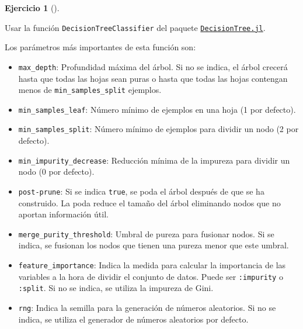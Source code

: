 \documentclass[
  a4paper,
]{scrreport}
\providecommand{\tightlist}{%
  \setlength{\itemsep}{0pt}\setlength{\parskip}{0pt}}\usepackage{longtable,booktabs,array}
\theoremstyle{definition}
\newtheorem{exercise}{Ejercicio}[chapter]
\theoremstyle{remark}
\begin{document}
\begin{exercise}[]
\begin{enumerate}
\begin{tcolorbox}
  Usar la función \texttt{DecisionTreeClassifier} del paquete
  \href{https://docs.juliahub.com/DecisionTree/}{\texttt{DecisionTree.jl}}.

  Los parámetros más importantes de esta función son:

  \begin{itemize}
  \tightlist
  \item
    \texttt{max\_depth}: Profundidad máxima del árbol. Si no se indica,
    el árbol crecerá hasta que todas las hojas sean puras o hasta que
    todas las hojas contengan menos de \texttt{min\_samples\_split}
    ejemplos.
  \item
    \texttt{min\_samples\_leaf}: Número mínimo de ejemplos en una hoja
    (1 por defecto).
  \item
    \texttt{min\_samples\_split}: Número mínimo de ejemplos para dividir
    un nodo (2 por defecto).
  \item
    \texttt{min\_impurity\_decrease}: Reducción mínima de la impureza
    para dividir un nodo (0 por defecto).
  \item
    \texttt{post-prune}: Si se indica \texttt{true}, se poda el árbol
    después de que se ha construido. La poda reduce el tamaño del árbol
    eliminando nodos que no aportan información útil.
  \item
    \texttt{merge\_purity\_threshold}: Umbral de pureza para fusionar
    nodos. Si se indica, se fusionan los nodos que tienen una pureza
    menor que este umbral.
  \item
    \texttt{feature\_importance}: Indica la medida para calcular la
    importancia de las variables a la hora de dividir el conjunto de
    datos. Puede ser \texttt{:impurity} o \texttt{:split}. Si no se
    indica, se utiliza la impureza de Gini.
  \item
    \texttt{rng}: Indica la semilla para la generación de números
    aleatorios. Si no se indica, se utiliza el generador de números
    aleatorios por defecto.
  \end{itemize}

  \end{tcolorbox}

  \begin{tcolorbox}[enhanced jigsaw, left=2mm, colback=white, coltitle=black, opacitybacktitle=0.6, titlerule=0mm, breakable, bottomrule=.15mm, toptitle=1mm, bottomtitle=1mm, colbacktitle=quarto-callout-tip-color!10!white, opacityback=0, rightrule=.15mm, title=\textcolor{quarto-callout-tip-color}{\faLightbulb}\hspace{0.5em}{Solución}, colframe=quarto-callout-tip-color-frame, arc=.35mm, leftrule=.75mm, toprule=.15mm]


\end{tcolorbox}
\end{enumerate}
\end{exercise}
\end{document}
